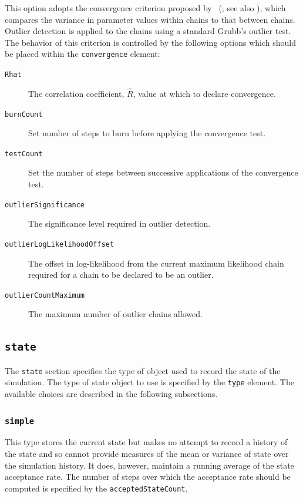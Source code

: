 This option adopts the convergence criterion proposed by \citeauthor{gelman_a._inference_1992}~(\citeyear{gelman_a._inference_1992}; see also \citealt{brooks_general_1998}), which compares the variance in parameter values within chains to that between chains. Outlier detection is applied to the chains using a standard Grubb's outlier test. The behavior of this criterion is controlled by the following options which should be placed within the {\tt convergence} element:
\begin{description}
\item [{\tt Rhat}] The correlation coefficient, $\hat{R}$, value at which to declare convergence.
\item [{\tt burnCount}] Set number of steps to burn before applying the convergence test.
\item [{\tt testCount}] Set the number of steps between successive applications of the convergence test.
\item [{\tt outlierSignificance}] The significance level required in outlier detection.
\item [{\tt outlierLogLikelihoodOffset}] The offset in log-likelihood from the current maximum likelihood chain required for a chain to be declared to be an outlier.
\item [{\tt outlierCountMaximum}] The maximum number of outlier chains allowed.
\end{description}

\subsection{{\tt state}}

The {\tt state} section specifies the type of object used to record the state of the simulation. The type of state object to use is specified by the {\tt type} element. The available choices are described in the following subsections.

\subsubsection{{\tt simple}}

This type stores the current state but makes no attempt to record a history of the state and so cannot provide measures of the mean or variance of state over the simulation history. It does, however, maintain a running average of the state acceptance rate. The number of steps over which the acceptance rate should be computed is specified by the {\tt acceptedStateCount}.

